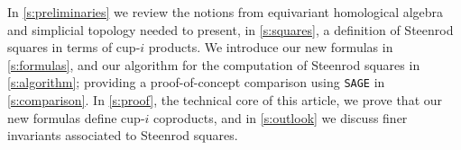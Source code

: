 In \cref{s:preliminaries} we review the notions from equivariant homological algebra and simplicial topology needed to present, in \cref{s:squares}, a definition of Steenrod squares in terms of cup-$i$ products.
We introduce our new formulas in \cref{s:formulas}, and our algorithm for the computation of Steenrod squares in \cref{s:algorithm}; providing a proof-of-concept comparison using \verb|SAGE| in \cref{s:comparison}.
In \cref{s:proof}, the technical core of this article, we prove that our new formulas define cup-$i$ coproducts, and in \cref{s:outlook} we discuss finer invariants associated to Steenrod squares.